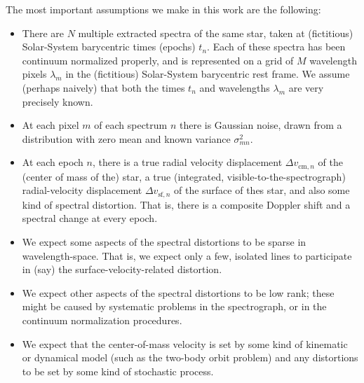 \documentclass[12pt, letterpaper]{article}
\newcommand{\com}{\mathrm{cm}}
\newcommand{\surf}{\mathrm{sf}}
\begin{document}
The most important assumptions we make in this work are the following:
\begin{itemize}\itemsep=0ex
\item There are $N$ multiple extracted spectra of the same star, taken
  at (fictitious) Solar-System barycentric times (epochs) $t_n$. Each
  of these spectra has been continuum normalized properly, and is
  represented on a grid of $M$ wavelength pixels $\lambda_m$ in the
  (fictitious) Solar-System barycentric rest frame. We assume (perhaps
  naively) that both the times $t_n$ and wavelengths $\lambda_m$ are
  very precisely known.
\item At each pixel $m$ of each spectrum $n$ there is Gaussian noise,
  drawn from a distribution with zero mean and known variance
  $\sigma^2_{mn}$.
\item At each epoch $n$, there is a true radial velocity displacement
  $\Delta v_{\com,n}$ of the (center of mass of the) star, a true
  (integrated, visible-to-the-spectrograph) radial-velocity
  displacement $\Delta v_{\surf,n}$ of the surface of thes star, and
  also some kind of spectral distortion.  That is, there is a
  composite Doppler shift and a spectral change at every epoch.
\item We expect some aspects of the spectral distortions to be sparse
  in wavelength-space.  That is, we expect only a few, isolated lines
  to participate in (say) the surface-velocity-related distortion.
\item We expect other aspects of the spectral distortions to be low
  rank; these might be caused by systematic problems in the
  spectrograph, or in the continuum normalization procedures.
\item We expect that the center-of-mass velocity is set by some kind
  of kinematic or dynamical model (such as the two-body orbit problem)
  and any distortions to be set by some kind of stochastic process.
\end{itemize}
\end{document}
